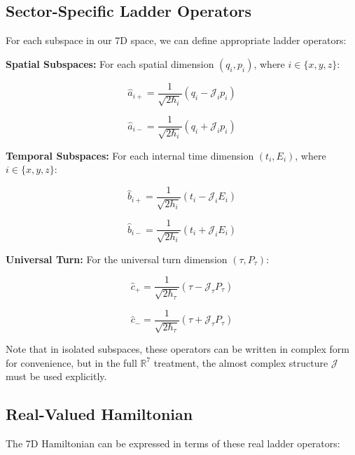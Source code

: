\documentclass{article}
\begin{document}
\subsection{Sector-Specific Ladder Operators}

For each subspace in our 7D space, we can define appropriate ladder operators:

\textbf{Spatial Subspaces:} For each spatial dimension $(q_i, p_i)$, where $i \in \{x, y, z\}$:

\begin{equation}
\hat{a}_{i+} = \frac{1}{\sqrt{2\hbar_i}}(q_i - \mathcal{J}_i p_i)
\end{equation}

\begin{equation}
\hat{a}_{i-} = \frac{1}{\sqrt{2\hbar_i}}(q_i + \mathcal{J}_i p_i)
\end{equation}

\textbf{Temporal Subspaces:} For each internal time dimension $(t_i, E_i)$, where $i \in \{x, y, z\}$:

\begin{equation}
\hat{b}_{i+} = \frac{1}{\sqrt{2h_i}}(t_i - \mathcal{J}_i E_i)
\end{equation}

\begin{equation}
\hat{b}_{i-} = \frac{1}{\sqrt{2h_i}}(t_i + \mathcal{J}_i E_i)
\end{equation}

\textbf{Universal Turn:} For the universal turn dimension $(\tau, P_\tau)$:

\begin{equation}
\hat{c}_+ = \frac{1}{\sqrt{2\hbar_\tau}}(\tau - \mathcal{J}_\tau P_\tau)
\end{equation}

\begin{equation}
\hat{c}_- = \frac{1}{\sqrt{2\hbar_\tau}}(\tau + \mathcal{J}_\tau P_\tau)
\end{equation}

Note that in isolated subspaces, these operators can be written in complex form for convenience, but in the full $\mathbb{R}^7$ treatment, the almost complex structure $\mathcal{J}$ must be used explicitly.

\subsection{Real-Valued Hamiltonian}

The 7D Hamiltonian can be expressed in terms of these real ladder operators:
\end{document}
